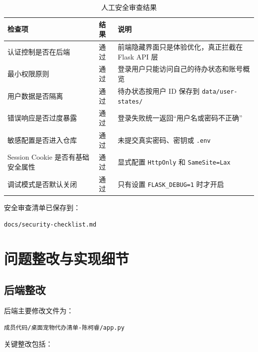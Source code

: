 \documentclass[12pt,a4paper]{ctexart}
\begin{document}
\begin{table}[H]
    \centering
    \caption{人工安全审查结果}
    \begin{tabularx}{\textwidth}{L{5cm}C{2cm}Y}
        \toprule
        检查项 & 结果 & 说明 \\
        \midrule
        认证控制是否在后端 & 通过 & 前端隐藏界面只是体验优化，真正拦截在 Flask API 层 \\
        最小权限原则 & 通过 & 登录用户只能访问自己的待办状态和账号概览 \\
        用户数据是否隔离 & 通过 & 待办状态按用户 ID 保存到 \texttt{data/user-states/} \\
        错误响应是否过度暴露 & 通过 & 登录失败统一返回“用户名或密码不正确” \\
        敏感配置是否进入仓库 & 通过 & 未提交真实密码、密钥或 \texttt{.env} \\
        Session Cookie 是否有基础安全属性 & 通过 & 显式配置 \texttt{HttpOnly} 和 \texttt{SameSite=Lax} \\
        调试模式是否默认关闭 & 通过 & 只有设置 \texttt{FLASK\_DEBUG=1} 时才开启 \\
        \bottomrule
    \end{tabularx}
\end{table}

安全审查清单已保存到：

\begin{verbatim}
docs/security-checklist.md
\end{verbatim}

\section{问题整改与实现细节}

\subsection{后端整改}

后端主要修改文件为：

\begin{verbatim}
成员代码/桌面宠物代办清单-陈柯睿/app.py
\end{verbatim}

关键整改包括：
\end{document}
